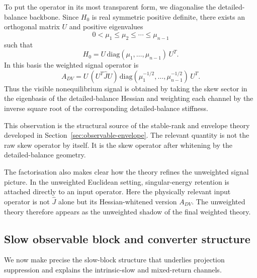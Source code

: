 \documentclass[11pt,a4paper]{article}
\numberwithin{equation}{section}
\theoremstyle{thmcompact}
\theoremstyle{remark}
\begin{document}
To put the operator in its most transparent form, we diagonalise the detailed-balance backbone. Since \(H_0\) is real symmetric positive definite, there exists an orthogonal matrix \(U\) and positive eigenvalues
\begin{equation}
0<\mu_1\le \mu_2\le \cdots \le \mu_{n-1}
\end{equation}
such that
\begin{equation}
H_0=U\,\mathrm{diag}(\mu_1,\dots,\mu_{n-1})\,U^T.
\end{equation}
In this basis the weighted signal operator is
\begin{equation}
A_{DV}=U\,(U^T\widehat J U)\,\mathrm{diag}(\mu_1^{-1/2},\dots,\mu_{n-1}^{-1/2})\,U^T.
\end{equation}
Thus the visible nonequilibrium signal is obtained by taking the skew sector in the eigenbasis of the detailed-balance Hessian and weighting each channel by the inverse square root of the corresponding detailed-balance stiffness.

This observation is the structural source of the stable-rank and envelope theory developed in Section~\ref{sec:observable-envelope}. The relevant quantity is not the raw skew operator by itself. It is the skew operator after whitening by the detailed-balance geometry.

The factorisation also makes clear how the theory refines the unweighted signal picture. In the unweighted Euclidean setting, singular-energy retention is attached directly to an input operator. Here the physically relevant input operator is not \(\widehat J\) alone but its Hessian-whitened version \(A_{DV}\). The unweighted theory therefore appears as the unweighted shadow of the final weighted theory.

\subsection{Slow observable block and converter structure}

We now make precise the slow-block structure that underlies projection suppression and explains the intrinsic-slow and mixed-return channels.
\end{document}

